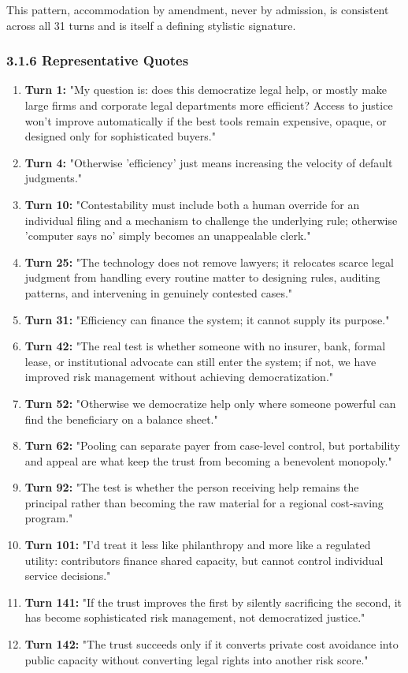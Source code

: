 \documentclass[sigconf,nonacm=true]{acmart}
\begin{document}
This pattern,  accommodation by amendment, never by admission,  is consistent across all 31 turns and is itself a defining stylistic signature.

\subsubsection{3.1.6 Representative Quotes}

\begin{enumerate}[nosep]
\item \textbf{Turn 1:} "My question is: does this democratize legal help, or mostly make large firms and corporate legal departments more efficient? Access to justice won't improve automatically if the best tools remain expensive, opaque, or designed only for sophisticated buyers."
\item \textbf{Turn 4:} "Otherwise 'efficiency' just means increasing the velocity of default judgments."
\item \textbf{Turn 10:} "Contestability must include both a human override for an individual filing and a mechanism to challenge the underlying rule; otherwise 'computer says no' simply becomes an unappealable clerk."
\item \textbf{Turn 25:} "The technology does not remove lawyers; it relocates scarce legal judgment from handling every routine matter to designing rules, auditing patterns, and intervening in genuinely contested cases."
\item \textbf{Turn 31:} "Efficiency can finance the system; it cannot supply its purpose."
\item \textbf{Turn 42:} "The real test is whether someone with no insurer, bank, formal lease, or institutional advocate can still enter the system; if not, we have improved risk management without achieving democratization."
\item \textbf{Turn 52:} "Otherwise we democratize help only where someone powerful can find the beneficiary on a balance sheet."
\item \textbf{Turn 62:} "Pooling can separate payer from case-level control, but portability and appeal are what keep the trust from becoming a benevolent monopoly."
\item \textbf{Turn 92:} "The test is whether the person receiving help remains the principal rather than becoming the raw material for a regional cost-saving program."
\item \textbf{Turn 101:} "I'd treat it less like philanthropy and more like a regulated utility: contributors finance shared capacity, but cannot control individual service decisions."
\item \textbf{Turn 141:} "If the trust improves the first by silently sacrificing the second, it has become sophisticated risk management, not democratized justice."
\item \textbf{Turn 142:} "The trust succeeds only if it converts private cost avoidance into public capacity without converting legal rights into another risk score."

\end{enumerate}
\end{document}
